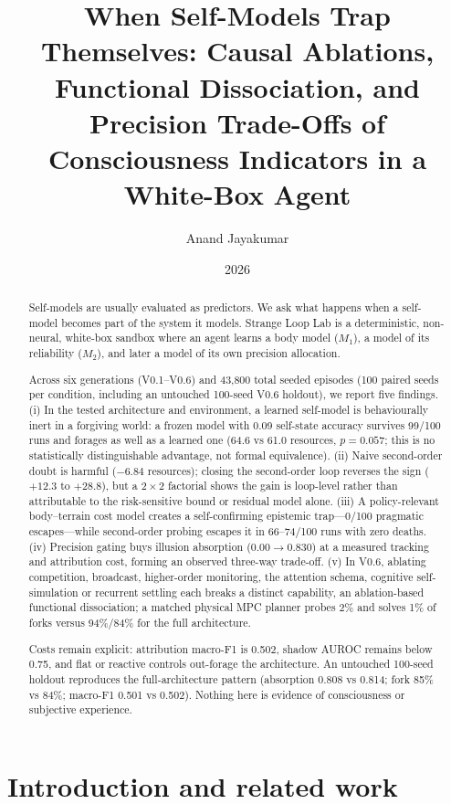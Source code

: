 \documentclass[11pt,a4paper]{article}
\title{\textbf{When Self-Models Trap Themselves: Causal Ablations, Functional Dissociation, and Precision Trade-Offs of Consciousness Indicators in a White-Box Agent}}
\author{Anand Jayakumar}
\date{2026}
\begin{document}
\maketitle

\begin{abstract}
\noindent
Self-models are usually evaluated as predictors. We ask what happens when a self-model becomes part of the system it models. Strange Loop Lab is a deterministic, non-neural, white-box sandbox where an agent learns a body model ($M_1$), a model of its reliability ($M_2$), and later a model of its own precision allocation.

Across six generations (V0.1--V0.6) and 43{,}800 total seeded episodes (100 paired seeds per condition, including an untouched 100-seed V0.6 holdout), we report five findings. (i) In the tested architecture and environment, a learned self-model is behaviourally inert in a forgiving world: a frozen model with 0.09 self-state accuracy survives 99/100 runs and forages as well as a learned one (64.6 vs 61.0 resources, $p=0.057$; this is no statistically distinguishable advantage, not formal equivalence). (ii) Naive second-order doubt is harmful ($-6.84$ resources); closing the second-order loop reverses the sign ($+12.3$ to $+28.8$), but a $2\times2$ factorial shows the gain is loop-level rather than attributable to the risk-sensitive bound or residual model alone. (iii) A policy-relevant body--terrain cost model creates a self-confirming epistemic trap---0/100 pragmatic escapes---while second-order probing escapes it in 66--74/100 runs with zero deaths. (iv) Precision gating buys illusion absorption ($0.00\rightarrow0.830$) at a measured tracking and attribution cost, forming an observed three-way trade-off. (v) In V0.6, ablating competition, broadcast, higher-order monitoring, the attention schema, cognitive self-simulation or recurrent settling each breaks a distinct capability, an ablation-based functional dissociation; a matched physical MPC planner probes 2\% and solves 1\% of forks versus 94\%/84\% for the full architecture.

Costs remain explicit: attribution macro-F1 is 0.502, shadow AUROC remains below 0.75, and flat or reactive controls out-forage the architecture. An untouched 100-seed holdout reproduces the full-architecture pattern (absorption 0.808 vs 0.814; fork 85\% vs 84\%; macro-F1 0.501 vs 0.502). Nothing here is evidence of consciousness or subjective experience.
\end{abstract}

\section{Introduction and related work}
\end{document}
